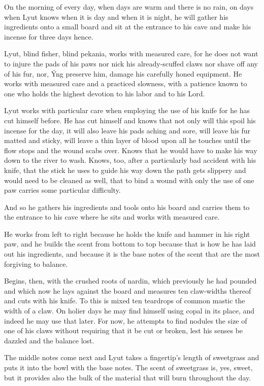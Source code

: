 On the morning of every day, when days are warm and there is no rain, on days when Lyut knows when it is day and when it is night, he will gather his ingredients onto a small board and sit at the entrance to his cave and make his incense for three days hence.

Lyut, blind fisher, blind pekania, works with measured care, for he does not want to injure the pads of his paws nor nick his already-scuffed claws nor shave off any of his fur, nor, Ýng preserve him, damage his carefully honed equipment. He works with measured care and a practiced slowness, with a patience known to one who holds the highest devotion to his labor and to his Lord.

Lyut works with particular care when employing the use of his knife for he has cut himself before. He has cut himself and knows that not only will this spoil his incense for the day, it will also leave his pads aching and sore, will leave his fur matted and sticky, will leave a thin layer of blood upon all he touches until the flow stops and the wound scabs over. Knows that he would have to make his way down to the river to wash. Knows, too, after a particularly bad accident with his knife, that the stick he uses to guide his way down the path gets slippery and would need to be cleaned as well, that to bind a wound with only the use of one paw carries some particular difficulty.

And so he gathers his ingredients and tools onto his board and carries them to the entrance to his cave where he sits and works with measured care.

He works from left to right because he holds the knife and hammer in his right paw, and he builds the scent from bottom to top because that is how he has laid out his ingredients, and because it is the base notes of the scent that are the most forgiving to balance.

Begins, then, with the crushed roots of nardin, which previously he had pounded and which now he lays against the board and measures ten claw-widths thereof and cuts with his knife. To this is mixed ten teardrops of common mastic the width of a claw. On holier days he may find himself using copal in its place, and indeed he may use that later. For now, he attempts to find nodules the size of one of his claws without requiring that it be cut or broken, lest his senses be dazzled and the balance lost.

The middle notes come next and Lyut takes a fingertip's length of sweetgrass and puts it into the bowl with the base notes. The scent of sweetgrass is, yes, sweet, but it provides also the bulk of the material that will burn throughout the day.

